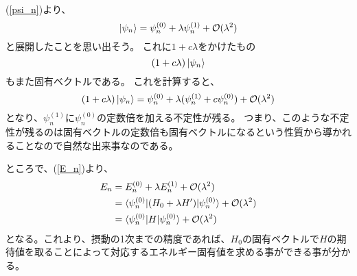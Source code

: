 (\ref{psi_n})より、
\begin{equation}
	\ket{\psi_n} = \psi_{n}^{(0)}+\lambda \psi_{n}^{(1)} + \mathcal{O}(\lambda^2)
\end{equation}
と展開したことを思い出そう。
これに$1+c\lambda$をかけたもの
\begin{equation}
	(1+c\lambda)\ket{\psi_n}
\end{equation}
もまた固有ベクトルである。
これを計算すると、
\begin{equation}
	(1+c\lambda)\ket{\psi_n} = \psi_{n}^{(0)} + \lambda(\psi_{n}^{(1)} + c\psi_{n}^{(0)}) + \mathcal{O}(\lambda^2)
\end{equation}
となり、$\psi_{n}^{(1)}$に$\psi_{n}^{(0)}$の定数倍を加える不定性が残る。
つまり、このような不定性が残るのは固有ベクトルの定数倍も固有ベクトルになるという性質から導かれることなので自然な出来事なのである。

ところで、(\ref{E_n})より、
\begin{align}
	E_{n} &= E_{n}^{(0)}+\lambda E_{n}^{(1)} + \mathcal{O}(\lambda^2) \\
				&= \braket{\psi_n^{(0)} | (H_0 + \lambda H') | \psi_n^{(0)}} + \mathcal{O}(\lambda^2) \\
				&= \braket{\psi_n^{(0)} | H | \psi_n^{(0)}} + \mathcal{O}(\lambda^2)
\end{align}
となる。これより、摂動の1次までの精度であれば、$H_0$の固有ベクトルで$H$の期待値を取ることによって対応するエネルギー固有値を求める事ができる事が分かる。

